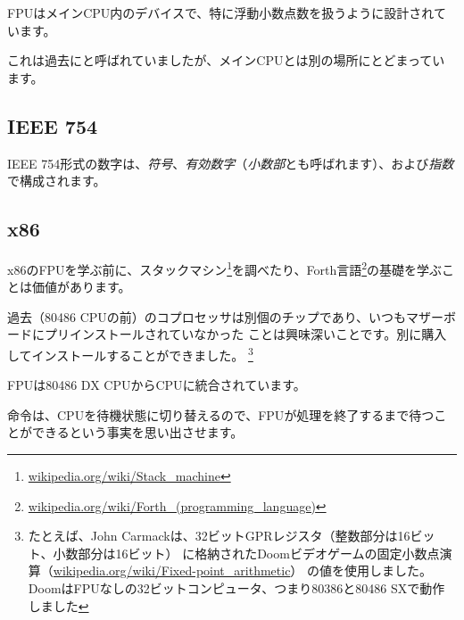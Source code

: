﻿\mysection{\FPUChapterName}
\label{sec:FPU}

\newcommand{\FNURLSTACK}{\footnote{\href{http://go.yurichev.com/17123}{wikipedia.org/wiki/Stack\_machine}}}
\newcommand{\FNURLFORTH}{\footnote{\href{http://go.yurichev.com/17124}{wikipedia.org/wiki/Forth\_(programming\_language)}}}
\newcommand{\FNURLIEEE}{\footnote{\href{http://go.yurichev.com/17125}{wikipedia.org/wiki/IEEE\_floating\_point}}}
\newcommand{\FNURLSP}{\footnote{\href{http://go.yurichev.com/17126}{wikipedia.org/wiki/Single-precision\_floating-point\_format}}}
\newcommand{\FNURLDP}{\footnote{\href{http://go.yurichev.com/17127}{wikipedia.org/wiki/Double-precision\_floating-point\_format}}}
\newcommand{\FNURLEP}{\footnote{\href{http://go.yurichev.com/17128}{wikipedia.org/wiki/Extended\_precision}}}

\ac{FPU}はメイン\ac{CPU}内のデバイスで、特に浮動小数点数を扱うように設計されています。

これは過去にと呼ばれていましたが、メイン\ac{CPU}とは別の場所にとどまっています。

\subsection{IEEE 754}

IEEE 754形式の数字は、\emph{符号}、\emph{有効数字}（\emph{小数部}とも呼ばれます）、および\emph{指数}で構成されます。

\subsection{x86}

x86の\ac{FPU}を学ぶ前に、スタックマシン\FNURLSTACK を調べたり、Forth言語\FNURLFORTH の基礎を学ぶことは価値があります。

過去（80486 CPUの前）のコプロセッサは別個のチップであり、いつもマザーボードにプリインストールされていなかった
ことは興味深いことです。別に購入してインストールすることができました。
\footnote{たとえば、John Carmackは、32ビット\ac{GPR}レジスタ（整数部分は16ビット、小数部分は16ビット）
に格納されたDoomビデオゲームの固定小数点演算（\href{http://go.yurichev.com/17356}{wikipedia.org/wiki/Fixed-point\_arithmetic}）
の値を使用しました。 DoomはFPUなしの32ビットコンピュータ、つまり80386と80486 SXで動作しました}

\ac{FPU}は80486 DX CPUから\ac{CPU}に統合されています。

命令は、\ac{CPU}を待機状態に切り替えるので、\ac{FPU}が処理を終了するまで待つことができるという事実を思い出させます。

